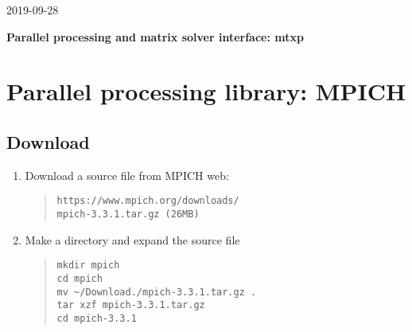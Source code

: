 \documentclass[11pt]{article}
\begin{document}
\begin{flushright}
2019-09-28
\end{flushright}

\begin{center}
{\Large \bf Parallel processing and matrix solver interface: mtxp}
\end{center}

\tableofcontents


\section{Parallel processing library: MPICH}

\subsection{Download}

\begin{enumerate}
\item
Download a source file from MPICH web: 
\begin{quote}
\begin{verbatim}
https://www.mpich.org/downloads/
mpich-3.3.1.tar.gz (26MB)
\end{verbatim}
\end{quote}
\item
Make a directory and expand the source file
\begin{quote}
\begin{verbatim}
mkdir mpich
cd mpich
mv ~/Download./mpich-3.3.1.tar.gz .
tar xzf mpich-3.3.1.tar.gz
cd mpich-3.3.1
\end{verbatim}
\end{quote}
\end{enumerate}
\end{document}
